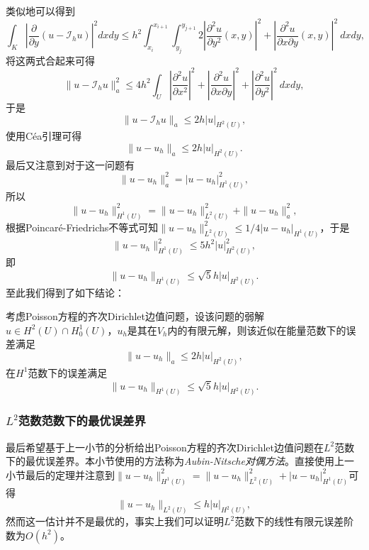 \documentclass[a4paper,10pt]{ctexart}
\begin{document}
类似地可以得到
\begin{equation}
    \int_K \left\vert \dfrac{\partial }{\partial y} (u-\mathcal{I}_h u) \right\vert^2 dxdy \leqslant h^2\int_{x_i}^{x_{i+1}} \int_{y_j}^{y_{j+1}} 2\left\vert \dfrac{\partial^2 u}{\partial y^2} (x,y) \right\vert^2 + \left\vert \dfrac{\partial^2 u}{\partial x \partial y} (x,y) \right\vert^2\ dxdy,
\end{equation}
将这两式合起来可得
\begin{equation}
    \| u-\mathcal{I}_h u \|_a^2 \leqslant 4h^2\int_U \left\vert \dfrac{\partial^2 u}{\partial x^2} \right\vert^2 + \left\vert \dfrac{\partial^2 u}{\partial x \partial y} \right\vert^2 + \left\vert \dfrac{\partial^2 u}{\partial y^2} \right\vert^2 \ dxdy,
\end{equation}
于是
\begin{equation}
    \| u-\mathcal{I}_h u \|_a \leqslant 2h| u |_{H^2(U)},
\end{equation}
使用Céa引理可得
\begin{equation}
    \| u-u_h \|_a \leqslant 2h| u |_{H^2(U)}.
\end{equation}
最后又注意到对于这一问题有
\[
    \| u-u_h \|_a^2 = | u-u_h |_{H^1(U)}^2,
\]
所以
\[
    \| u-u_h \|_{H^1(U)}^2 = \| u-u_h \|_{L^2(U)}^2 + \| u-u_h \|_a^2,
\]
根据Poincaré-Friedrichs不等式可知$ \| u-u_h \|_{L^2(U)}^2 \leqslant 1 / 4|u-u_h|_{H^1(U)} $，于是
\[
    \| u-u_h \|_{H^1(U)}^2 \leqslant 5h^2 | u |_{H^2(U)}^2,
\]
即
\begin{equation}
    \| u-u_h \|_{H^1(U)} \leqslant \sqrt{5}  h| u |_{H^2(U)}.
\end{equation}
至此我们得到了如下结论：
\begin{theorem}
    考虑Poisson方程的齐次Dirichlet边值问题，设该问题的弱解$ u\in H^2(U)\cap H^1_0(U) $，$ u_h $是其在$ V_h $内的有限元解，则该近似在能量范数下的误差满足
    \begin{equation}
        \| u-u_h \|_a \leqslant 2h| u |_{H^2(U)},
    \end{equation}
    在$ H^1 $范数下的误差满足
    \begin{equation}
        \| u-u_h \|_{H^1(U)} \leqslant \sqrt{5} h| u |_{H^2(U)}.
    \end{equation}
\end{theorem}

\subsubsection{\texorpdfstring{$L^2$}{L2}范数范数下的最优误差界}
最后希望基于上一小节的分析给出Poisson方程的齐次Dirichlet边值问题在$ L^2 $范数下的最优误差界。本小节使用的方法称为\emph{Aubin-Nitsche对偶方法}。直接使用上一小节最后的定理并注意到$ \| u-u_h \|_{H^1(U)}^2 = \| u-u_h \|_{L^2(U)}^2 + |u-u_h|_{H^1(U)}^2 $可得
\[
    \| u-u_h \|_{L^2(U)} \leqslant h | u |_{H^2(U)},
\]
然而这一估计并不是最优的，事实上我们可以证明$ L^2 $范数下的线性有限元误差阶数为$ O(h^2) $。
\end{document}
